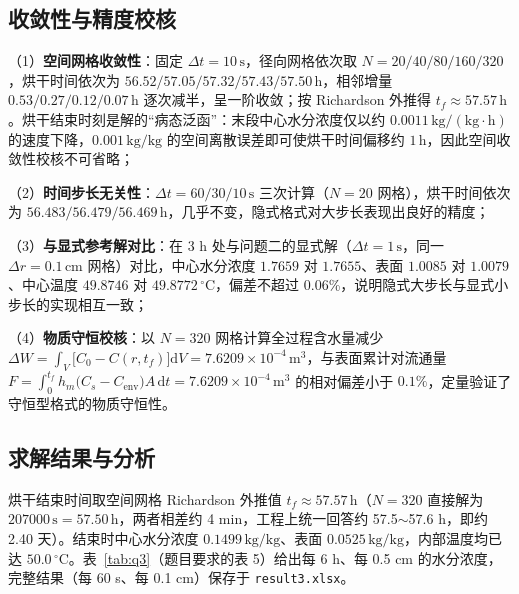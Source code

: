 \documentclass[withoutpreface,bwprint]{cumcmthesis} %
\begin{document}
\subsection{收敛性与精度校核}

（1）\textbf{空间网格收敛性}：固定 $\Delta t=10\,\mathrm{s}$，径向网格依次取 $N=20/40/80/160/320$，烘干时间依次为 $56.52/57.05/57.32/57.43/57.50\,\mathrm{h}$，相邻增量 $0.53/0.27/0.12/0.07\,\mathrm{h}$ 逐次减半，呈一阶收敛；按 Richardson 外推得 $t_f\approx57.57\,\mathrm{h}$。烘干结束时刻是解的“病态泛函”：末段中心水分浓度仅以约 $0.0011\,\mathrm{kg/(kg\cdot h)}$ 的速度下降，$0.001\,\mathrm{kg/kg}$ 的空间离散误差即可使烘干时间偏移约 $1\,\mathrm{h}$，因此空间收敛性校核不可省略；

（2）\textbf{时间步长无关性}：$\Delta t=60/30/10\,\mathrm{s}$ 三次计算（$N=20$ 网格），烘干时间依次为 $56.483/56.479/56.469\,\mathrm{h}$，几乎不变，隐式格式对大步长表现出良好的精度；

（3）\textbf{与显式参考解对比}：在 3 h 处与问题二的显式解（$\Delta t=1\,\mathrm{s}$，同一 $\Delta r=0.1\,\mathrm{cm}$ 网格）对比，中心水分浓度 $1.7659$ 对 $1.7655$、表面 $1.0085$ 对 $1.0079$、中心温度 $49.8746$ 对 $49.8772\,{}^\circ$C，偏差不超过 0.06\%，说明隐式大步长与显式小步长的实现相互一致；

（4）\textbf{物质守恒校核}：以 $N=320$ 网格计算全过程含水量减少 $\Delta W=\int_V\bigl[C_0-C(r,t_f)\bigr]\mathrm{d}V=7.6209\times10^{-4}\,\mathrm{m^3}$，与表面累计对流通量 $F=\int_0^{t_f}h_m\bigl(C_s-C_{\mathrm{env}}\bigr)A\,\mathrm{d}t=7.6209\times10^{-4}\,\mathrm{m^3}$ 的相对偏差小于 $0.1\%$，定量验证了守恒型格式的物质守恒性。

\subsection{求解结果与分析}

烘干结束时间取空间网格 Richardson 外推值 $t_f\approx57.57\,\mathrm{h}$（$N=320$ 直接解为 $207000\,\mathrm{s}=57.50\,\mathrm{h}$，两者相差约 4 min，工程上统一回答约 57.5$\sim$57.6 h，即约 2.40 天）。结束时中心水分浓度 $0.1499\,\mathrm{kg/kg}$、表面 $0.0525\,\mathrm{kg/kg}$，内部温度均已达 $50.0\,{}^\circ$C。表~\ref{tab:q3}（题目要求的表 5）给出每 6 h、每 0.5 cm 的水分浓度，完整结果（每 60 s、每 0.1 cm）保存于 \texttt{result3.xlsx}。
\end{document}
